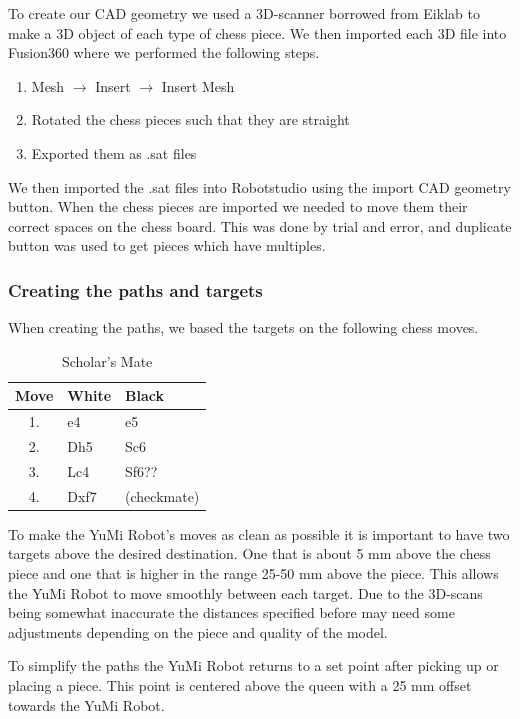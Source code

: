 \documentclass[a4paper,12pt]{article}
\begin{document}
To create our CAD geometry we used a 3D-scanner borrowed from Eiklab to make a 3D object of each type of chess piece. We then imported each 3D file into Fusion360 where we performed the following steps.
\begin{enumerate}
    \item Mesh $\rightarrow$ Insert $\rightarrow$ Insert Mesh
    \item Rotated the chess pieces such that they are straight
    \item Exported them as .sat files
\end{enumerate}
We then imported the .sat files into Robotstudio using the import CAD geometry button. When the chess pieces are imported we needed to move them their correct spaces on the chess board. This was done by trial and error, and duplicate button was used to get pieces which have multiples.

\subsubsection{Creating the paths and targets}
\label{sec:Challenge_paths_targets}
When creating the paths, we based the targets on the following chess moves.

\begin{table}[h] %
    \centering
    \begin{tabular}{c l l}
        \hline
        Move & White & Black \\
        \hline
        1. & e4 & e5 \\
        2. & Dh5 & Sc6 \\
        3. & Lc4 & Sf6?? \\
        4. & Dxf7 & (checkmate) \\
        \hline
    \end{tabular}
    \caption{Scholar's Mate}
    \label{tab:chess_moves}
\end{table}
To make the YuMi Robot's moves as clean as possible it is important to have two targets above the desired destination. One that is about 5 mm above the chess piece and one that is higher in the range 25-50 mm above the piece. This allows the YuMi Robot to move smoothly between each target. Due to the 3D-scans being somewhat inaccurate the distances specified before may need some adjustments depending on the piece and quality of the model.

To simplify the paths the YuMi Robot returns to a set point after picking up or placing a piece. This point is centered above the queen with a 25 mm offset towards the YuMi Robot. 
\end{document}

